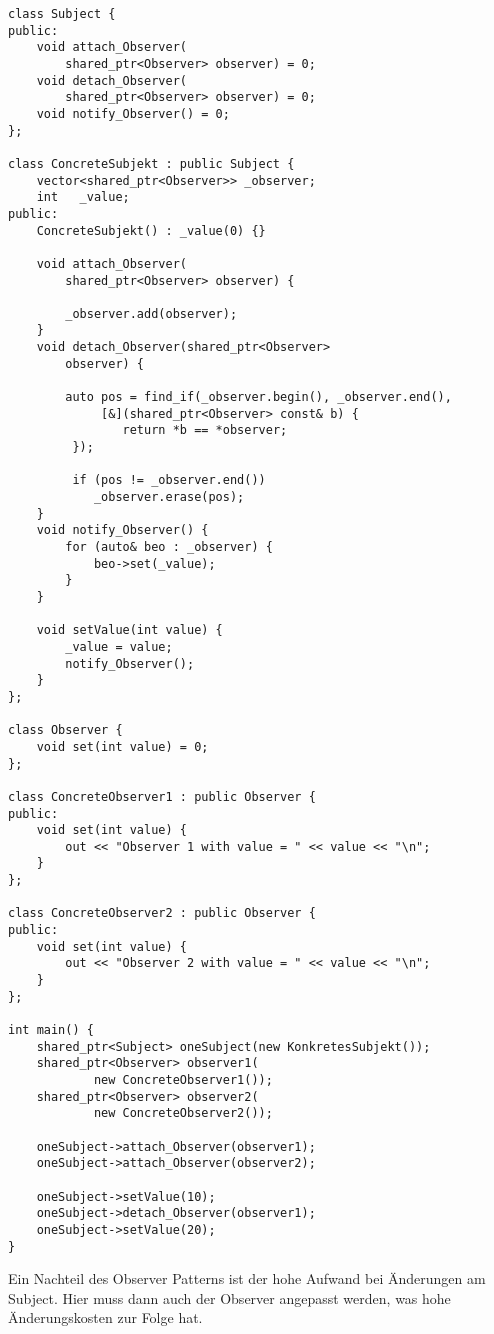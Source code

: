  \begin{lstlisting}
class Subject {
public:
    void attach_Observer(
    	shared_ptr<Observer> observer) = 0;
    void detach_Observer(
    	shared_ptr<Observer> observer) = 0;
    void notify_Observer() = 0;
};
 
class ConcreteSubjekt : public Subject {
    vector<shared_ptr<Observer>> _observer;
    int   _value;
public:
    ConcreteSubjekt() : _value(0) {}
 
    void attach_Observer(
    	shared_ptr<Observer> observer) {
    	
        _observer.add(observer);
    }
    void detach_Observer(shared_ptr<Observer>
    	observer) {
    	
        auto pos = find_if(_observer.begin(), _observer.end(),
        	 [&](shared_ptr<Observer> const& b) { 
        	 	return *b == *observer;
         });
          
         if (pos != _observer.end()) 
         	_observer.erase(pos);
    }
    void notify_Observer() {
        for (auto& beo : _observer) {
            beo->set(_value);
        }
    }
 
    void setValue(int value) {
        _value = value;
        notify_Observer();
    }
};
 
class Observer {
    void set(int value) = 0;
};
 
class ConcreteObserver1 : public Observer {
public:
    void set(int value) {
        out << "Observer 1 with value = " << value << "\n";
    }
};
 
class ConcreteObserver2 : public Observer {
public:
    void set(int value) {
        out << "Observer 2 with value = " << value << "\n";
    }
};
 
int main() {
    shared_ptr<Subject> oneSubject(new KonkretesSubjekt());
    shared_ptr<Observer> observer1(
    		new ConcreteObserver1());
    shared_ptr<Observer> observer2(
    		new ConcreteObserver2());
 
    oneSubject->attach_Observer(observer1);
    oneSubject->attach_Observer(observer2);
 
    oneSubject->setValue(10);
    oneSubject->detach_Observer(observer1);
    oneSubject->setValue(20);
}
\end{lstlisting}
 Ein Nachteil des Observer Patterns ist der hohe Aufwand bei Änderungen am
 Subject. Hier muss dann auch der Observer angepasst werden, was hohe Änderungskosten zur
 Folge hat.

